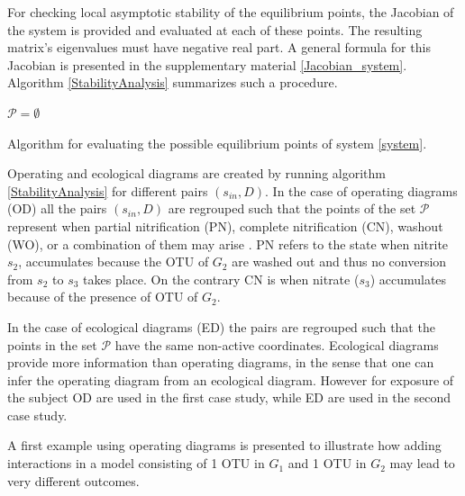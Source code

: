 \documentclass[3p,times]{article}
\newcommand{\N}{\mathbb{N}}
\newcommand{\R}{\mathbb{R}}
\begin{document}
For checking local asymptotic stability of the equilibrium points, the Jacobian of the system is provided and evaluated at each of these points. The resulting matrix's eigenvalues must have negative real part. A general formula for this Jacobian is presented in the supplementary material \eqref{Jacobian_system}. Algorithm \ref{StabilityAnalysis} summarizes such a procedure.

\begin{algorithm}[H]
	\KwData{$A \in M_{n\times n}(\R)$, $D, s_{in}, \bar{\mu}_i,K_i, k_i,  \in \R \, i\in [n], $, $n_1, n_2 \in \N$}
	$\mathcal{P} = \emptyset$ \\
	\label{StabilityAnalysis}
	\caption{Algorithm for evaluating the possible equilibrium points of system \eqref{system}.}
\end{algorithm}


Operating and ecological diagrams are created by running algorithm \ref{StabilityAnalysis} for different pairs $(s_{in},D)$. In the case of operating diagrams\cite{lobry2017chemostat} (OD) all the pairs $(s_{in},D)$ are regrouped such that the points of the set $\mathcal{P}$ represent when partial nitrification (PN), complete nitrification (CN), washout (WO), or a combination of them may arise \cite{KHIN2004519}. PN refers to the state when nitrite $s_2$, accumulates because the OTU of $G_2$ are washed out and thus no conversion from $s_2$  to $s_3$ takes place. On the contrary CN is when nitrate ($s_3$) accumulates because of the presence of OTU of $G_2$. 

In the case of ecological diagrams (ED) the pairs are regrouped such that the points in the set $\mathcal{P}$ have the same non-active coordinates. Ecological diagrams provide more information than operating diagrams, in the sense that one can infer the operating diagram from an ecological diagram. However for exposure of the subject OD are used in the first case study, while ED are used in the second case study.

A first example using operating diagrams is presented to illustrate how adding interactions in a model consisting of 1 OTU in $G_1$ and 1 OTU in $G_2$ may lead to very different outcomes.
\end{document}
